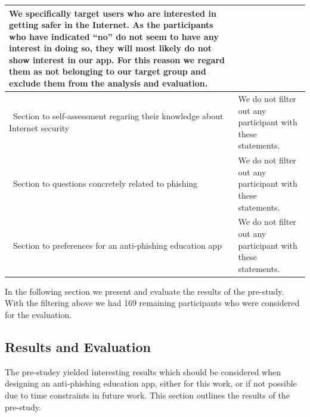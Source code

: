 \begin{center}
\begin{tabular}{ | p{5cm} | p{10cm} |}
 We specifically target users who are interested in getting safer in the Internet.
 As the participants who have indicated ``no'' do not seem to have any interest in doing so, they will most likely do not show interest in our app.
 For this reason we regard them as not belonging to our target group and exclude them from the analysis and evaluation.
\\
    \hline\  Section to self-assessment regaring their knowledge about Internet security &  We do not filter out any participant with these statements.
\\
		\hline\  Section to questions concretely related to phishing & We do not filter out any participant with these statements.
 \\
    \hline\  Section to preferences for an anti-phishing education app & We do not filter out any participant with these statements.
\\
    \hline
    \end{tabular}
		
\end{center}

In the following section we present and evaluate the results of the pre-study.
 With the filtering above we had 169 remaining participants who were considered for the evaluation.

\subsection{Results and Evaluation}
The pre-studey yielded interesting results which should be considered when designing an anti-phishing education app, either for this work, or if not possible due to time constraints in future work.
 This section outlines the results of the pre-study.


